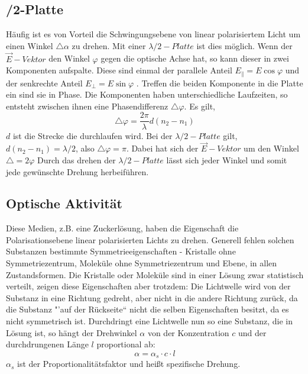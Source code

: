 \subsection{\lambda/2-Platte}
Häufig ist es von Vorteil die Schwingungsebene von linear polarisiertem Licht um einen Winkel $ \bigtriangleup\alpha $ zu drehen. Mit einer $ \lambda/2-Platte $ ist dies möglich. Wenn der $ \vec{E}-Vektor $ den Winkel $ \varphi $ gegen die optische Achse hat, so kann dieser in zwei Komponenten aufspalte. Diese sind einmal der parallele Anteil $ E_{\|} = E\cos \varphi $ und der senkrechte Anteil $ E_{\bot}=E\sin \varphi $ . Treffen die beiden Komponente in die Platte ein sind sie in Phase. Die Komponenten haben unterschiedliche Laufzeiten, so entsteht zwischen ihnen eine Phasendifferenz $\bigtriangleup\varphi $. Es gilt, 
\begin{equation}
\bigtriangleup\varphi=\frac{2\pi}{\lambda}d(n_{2}-n_{1})
\end{equation}
$d$ ist die Strecke die durchlaufen wird. Bei der $ \lambda/2 - Platte $ gilt, $ d(n_{2}-n_{1})=\lambda/2 $, also $ \bigtriangleup\varphi=\pi $. Dabei hat sich der $ \vec{E}-Vektor $ um den Winkel $\bigtriangleup=2\varphi $ Durch das drehen der $ \lambda/2-Platte $ lässt sich jeder Winkel und somit jede gewünschte Drehung herbeiführen.
\subsection{Optische Aktivität}
Diese Medien, z.B. eine Zuckerlösung, haben die Eigenschaft die Polarisationsebene linear polarisierten Lichts zu drehen. Generell fehlen solchen Substanzen bestimmte Symmetrieeigenschaften - Kristalle ohne Symmetriezentrum, Moleküle ohne Symmetriezentrum und Ebene, in allen Zustandsformen. Die Kristalle oder Moleküle sind in einer Lösung zwar statistisch verteilt, zeigen diese Eigenschaften aber trotzdem: Die Lichtwelle wird von der Substanz in eine Richtung gedreht, aber nicht in die andere Richtung zurück, da die Substanz "'auf der Rückseite`` nicht die selben Eigenschaften besitzt, da es nicht symmetrisch ist. Durchdringt eine Lichtwelle nun so eine Substanz, die in Lösung ist, so hängt der Drehwinkel $\alpha$ von der Konzentration $c$ und der durchdrungenen Länge $l$ proportional ab:
\begin{equation}
\alpha = \alpha_{s}\cdot c\cdot l
\end{equation}
$\alpha_{s}$ ist der Proportionalitätsfaktor und heißt spezifische Drehung.